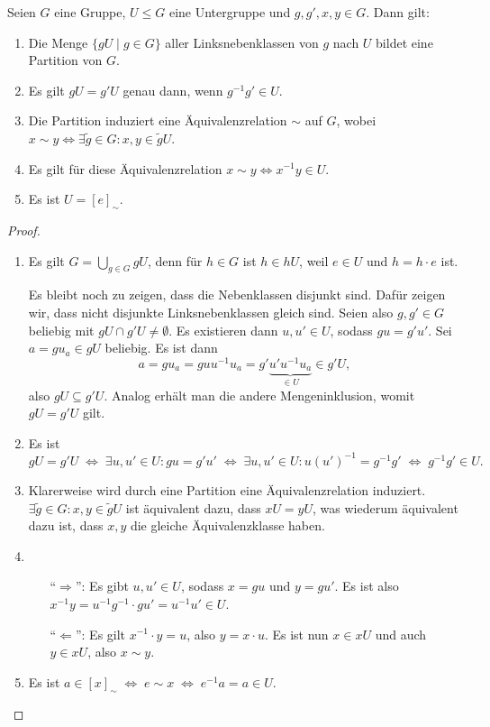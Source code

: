 \begin{lemma}\label{lemma:euqivrel_linksnebenklassen}
    Seien $G$ eine Gruppe, $U \le G$ eine Untergruppe und $g, g', x, y \in G$. Dann gilt:
    \begin{enumerate}
        \item Die Menge $\{gU \mid g \in G\}$ aller Linksnebenklassen von $g$ nach $U$ bildet eine Partition von $G$.
        \item Es gilt $gU = g'U$ genau dann, wenn $g^{-1}g' \in U$.
        \item Die Partition induziert eine Äquivalenzrelation $\sim$ auf $G$, wobei $x \sim y \Leftrightarrow \exists \tilde{g} \in G: x,y \in \tilde{g}U$.
        \item Es gilt für diese Äquivalenzrelation $x \sim y \Leftrightarrow x^{-1}y \in U$.\label{item:lemma:euqivrel_linksnebenklassen_4}
        \item Es ist $U = [e]_{\sim}$.
    \end{enumerate}
    
\end{lemma}
\begin{proof}{\ }
    \begin{enumerate}
        \item Es gilt $G = \bigcup_{g \in G} gU$, denn für $h \in G$ ist $h \in hU$, weil $e \in U$ und $h = h \cdot e$ ist. 
        
        Es bleibt noch zu zeigen, dass die Nebenklassen disjunkt sind. Dafür zeigen wir, dass nicht disjunkte Linksnebenklassen gleich sind. Seien also $g, g' \in G$ beliebig mit $gU \cap g'U \not= \emptyset$. Es existieren dann $u, u' \in U$, sodass $g u = g' u'$. Sei $a = g  u_a \in gU$ beliebig. Es ist dann $$ a = g u_a = g u u^{-1} u_a = g' \underbrace{u' u^{-1} u_a}_{\in U} \in g'U, $$
        also $gU \subseteq g'U$. Analog erhält man die andere Mengeninklusion, womit $gU = g'U$ gilt.
        \item Es ist 
        $$gU = g'U \;\Leftrightarrow\; \exists u, u' \in U: gu = g'u' \;\Leftrightarrow\; \exists u, u' \in U: u\left(u'\right)^{-1} = g^{-1}g' \;\Leftrightarrow\; g^{-1}g' \in U.$$
        \item Klarerweise wird durch eine Partition eine Äquivalenzrelation induziert. $\exists \tilde{g} \in G: x,y \in \tilde{g}U$ ist äquivalent dazu, dass $xU = yU$, was wiederum äquivalent dazu ist, dass $x, y$ die gleiche Äquivalenzklasse haben.
        \item \begin{itemize}[leftmargin=1cm]
            \item[``$\Rightarrow$'':] Es gibt $u, u' \in U$, sodass $x = g u$ und $y = g u'$. Es ist also $x^{-1} y = u^{-1} g^{-1} \cdot g  u' = u^{-1} u' \in U$.
            \item[``$\Leftarrow$'':] Es gilt $x^{-1}\cdot y = u$, also $y = x\cdot u$.  Es ist nun $x \in xU$ und auch  $y \in xU$, also $x \sim y$. 
        \end{itemize}
        \item Es ist $a \in [x]_\sim \;\Leftrightarrow\; e \sim x \;\Leftrightarrow\; e^{-1} a = a \in U $.
    \end{enumerate}
\end{proof}

